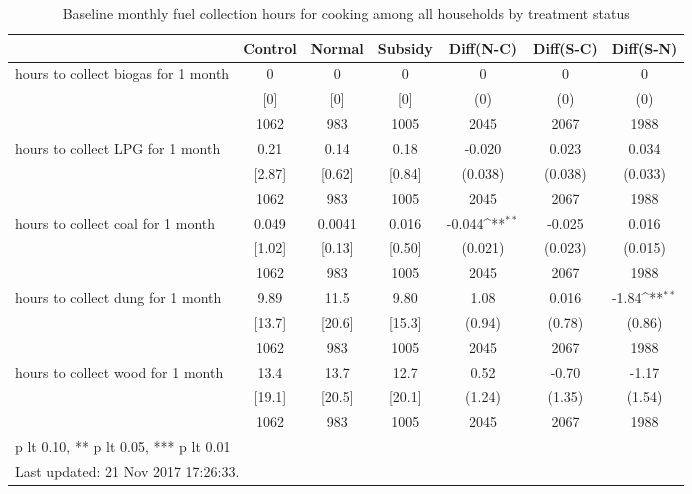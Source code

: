 \begin{table}[htbp]\centering
\def\sym#1{\ifmmode^{#1}\else\(^{#1}\)\fi}
\caption{Baseline monthly fuel collection hours for cooking among all households by treatment status \label{tab:"balance"}}
\begin{tabular*}{1\hsize}{@{\hskip\tabcolsep\extracolsep\fill}l*{1}{cccccc}}
\toprule
                                &  Control&   Normal&  Subsidy&Diff(N-C)         &Diff(S-C)         &Diff(S-N)         \\
\midrule
hours to collect biogas for 1 month&        0&        0&        0&        0         &        0         &        0         \\
                                &      [0]&      [0]&      [0]&      (0)         &      (0)         &      (0)         \\
                                &     1062&      983&     1005&     2045         &     2067         &     1988         \\
hours to collect LPG for 1 month&     0.21&     0.14&     0.18&   -0.020         &    0.023         &    0.034         \\
                                &   [2.87]&   [0.62]&   [0.84]&  (0.038)         &  (0.038)         &  (0.033)         \\
                                &     1062&      983&     1005&     2045         &     2067         &     1988         \\
hours to collect coal for 1 month&    0.049&   0.0041&    0.016&   -0.044\sym{**} &   -0.025         &    0.016         \\
                                &   [1.02]&   [0.13]&   [0.50]&  (0.021)         &  (0.023)         &  (0.015)         \\
                                &     1062&      983&     1005&     2045         &     2067         &     1988         \\
hours to collect dung for 1 month&     9.89&     11.5&     9.80&     1.08         &    0.016         &    -1.84\sym{**} \\
                                &   [13.7]&   [20.6]&   [15.3]&   (0.94)         &   (0.78)         &   (0.86)         \\
                                &     1062&      983&     1005&     2045         &     2067         &     1988         \\
hours to collect wood for 1 month&     13.4&     13.7&     12.7&     0.52         &    -0.70         &    -1.17         \\
                                &   [19.1]&   [20.5]&   [20.1]&   (1.24)         &   (1.35)         &   (1.54)         \\
                                &     1062&      983&     1005&     2045         &     2067         &     1988         \\
\bottomrule
\multicolumn{7}{l}{\footnotesize * p lt 0.10, ** p lt 0.05, *** p lt 0.01}\\
\multicolumn{7}{l}{\footnotesize Last updated: 21 Nov 2017 17:26:33.}\\
\end{tabular*}
\end{table}
